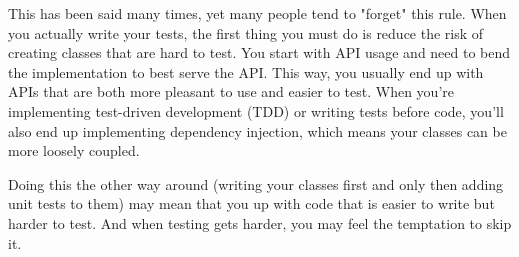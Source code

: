 
This has been said many times, yet many people tend to "forget" this rule. When you actually write your tests, the first thing you must do is reduce the risk of creating classes that are hard to test. You start with API usage and need to bend the implementation to best serve the API. This way, you usually end up with APIs that are both more pleasant to use and easier to test. When you're implementing test-driven development (TDD) or writing tests before code, you'll also end up implementing dependency injection, which means your classes can be more loosely coupled.

Doing this the other way around (writing your classes first and only then adding unit tests to them) may mean that you up with code that is easier to write but harder to test. And when testing gets harder, you may feel the temptation to skip it.













